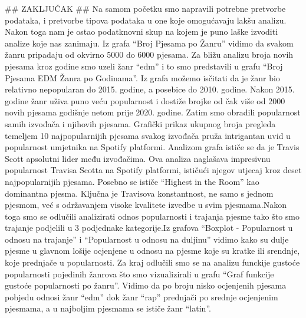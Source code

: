 \documentclass[
]{article}
\begin{document}
\#\# ZAKLJUČAK \#\# Na samom početku smo napravili potrebne pretvorbe
podataka, i pretvorbe tipova podataka u one koje omogućavaju lakšu
analizu. Nakon toga nam je ostao podatknovni skup na kojem je puno laške
izvoditi analize koje nas zanimaju. Iz grafa ``Broj Pjesama po Žanru''
vidimo da svakom žanru pripadaju od okvirno 5000 do 6000 pjesama. Za
bližu analizu broja novih pjesama kroz godine smo uzeli žanr ``edm'' i
to smo predstavili u grafu ``Broj Pjesama EDM Žanra po Godinama''. Iz
grafa možemo isčitati da je žanr bio relativno nepopularan do 2015.
godine, a posebice do 2010. godine. Nakon 2015. godine žanr uživa puno
veću popularnost i dostiže brojke od čak više od 2000 novih pjesama
godišnje netom prije 2020. godine. Zatim smo obradili popularnost samih
izvođača i njihovih pjesama. Grafički prikaz ukupnog broja pregleda
temeljem 10 najpopularnijih pjesama svakog izvođača pruža intrigantan
uvid u popularnost umjetnika na Spotify platformi. Analizom grafa ističe
se da je Travis Scott apsolutni lider među izvođačima. Ova analiza
naglašava impresivnu popularnost Travisa Scotta na Spotify platformi,
ističući njegov utjecaj kroz deset najpopularnijih pjesama. Posebno se
ističe ``Highest in the Room'' kao dominantna pjesma. Ključna je
Travisova konstantnost, ne samo s jednom pjesmom, već s održavanjem
visoke kvalitete izvedbe u svim pjesmama.Nakon toga smo se odlučili
analizirati odnos popularnosti i trajanja pjesme tako što smo trajanje
podjelili u 3 podjednake kategorije.Iz grafova ``Boxplot - Popularnost u
odnosu na trajanje'' i ``Popularnost u odnosu na duljinu'' vidimo kako
su dulje pjesme u glavnom lošije ocjenjene u odnosu na pjesme koje su
kratke ili srendnje, koje prednjače u popularnosti. Za kraj odlučili smo
se na analizu funckije gustoće popularnosti pojedinih žanrova što smo
vizualizirali u grafu ``Graf funkcije gustoće popularnosti po žanru''.
Vidimo da po broju nisko ocjenjenih pjesama pobjedu odnosi žanr ``edm''
dok žanr ``rap'' prednjači po srednje ocjenjenim pjesmama, a u najboljim
pjesmama se ističe žanr ``latin''.
\end{document}
